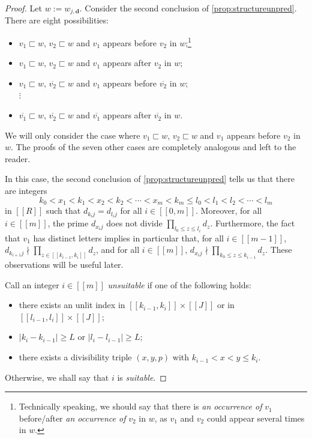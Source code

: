 \documentclass[11pt]{amsart}
\theoremstyle{definition}
\renewcommand{\leq}{\leqslant}
\renewcommand{\geq}{\geqslant}
\newcommand{\interval}[2]{[\![#1,#2]\!] }
\newcommand{\sinterval}[1]{[\![#1]\!] }
\newcommand{\abs}[1]{\left|#1\right|}
\renewcommand{\d}{\boldsymbol{d}}
\newcommand{\pcomp}[2]{d_{#1#2}}
\newcommand{\elln}{L}
\newcommand{\newR}{\sinterval{J}}
\newcommand{\mm}{m}
\newcommand{\tupsize}{R}
\newcommand{\thisx}{x}
\newcommand{\thisy}{y}
\begin{document}
\begin{proof}
Let $w := w_{j,\d}$. Consider the second conclusion of \cref{prop:structureunpred}. There are eight possibilities:
\begin{itemize}
	\item $v_1 \sqsubset w$, $v_2 \sqsubset w$ and $v_1$ appears before $v_2$ in $w$;\footnote{Technically speaking, we should say that there is \emph{an occurrence of} $v_1$ before/after \emph{an occurrence of} $v_2$ in $w$, as $v_1$ and $v_2$ could appear several times in $w$.}
	\item $v_1 \sqsubset w$, $v_2 \sqsubset w$ and $v_1$ appears after $v_2$ in $w$;
	\item $v_1 \sqsubset w$, $\overline{v_2} \sqsubset w$ and $v_1$ appears before $\overline{v_2}$ in $w$;\\
	 $\vdots$
	 \item $\overline{v_1} \sqsubset w$, $\overline{v_2} \sqsubset w$ and $\overline{v_1}$ appears after $\overline{v_2}$ in $w$.
\end{itemize}
We will only consider the case where $v_1 \sqsubset w$, $v_2 \sqsubset w$ and $v_1$ appears before $v_2$ in $w$. The proofs of the seven other cases are completely analogous and left to the reader. 

In this case, the second conclusion of \cref{prop:structureunpred} tells us that there are integers
\begin{equation}
\label{eq:ikxinequalities}
k_0<x_1<k_1<x_2<k_2<\cdots<x_\mm<k_\mm\leq l_0<l_1<l_2<\cdots <l_\mm
\end{equation}
in $\sinterval{\tupsize}$ such that $\pcomp{k_i}{j} = \pcomp{l_i}{j}$ for all $i\in \interval{0}{\mm}$. Moreover, for all $i\in \sinterval{\mm}$, the prime $\pcomp{x_i}{j}$ does not divide $\prod_{l_0\leq z\leq l_i} d_{z}$. Furthermore, the fact that $v_1$ has distinct letters implies in particular that, for all $i\in \sinterval{m-1}$, $\pcomp{k_{i+1}}{j} \nmid \prod_{z\in \interval{k_{i-1}}{k_i}} d_z$, and for all $i\in \sinterval{m}$, $\pcomp{x_i}{j} \nmid \prod_{k_0\leq z \leq k_{i-1}} d_z$. These observations will be useful later.

Call an integer $i\in \sinterval{\mm}$ \emph{unsuitable} if one of the following holds:
\begin{itemize}
	\item there exists an unlit index in $\interval{k_{i-1}}{k_i}\times \newR$ or in $\interval{l_{i-1}}{l_i}\times \newR$;
	\item $\abs{k_i-k_{i-1}}\geq \elln$ or $\abs{l_i-l_{i-1}}\geq \elln$;
	\item there exists a divisibility triple $(\thisx,\thisy,p)$ with $k_{i-1}<\thisx<\thisy\leq k_i$.
\end{itemize}
Otherwise, we shall say that $i$ is \emph{suitable}.


\end{proof}
\end{document}
